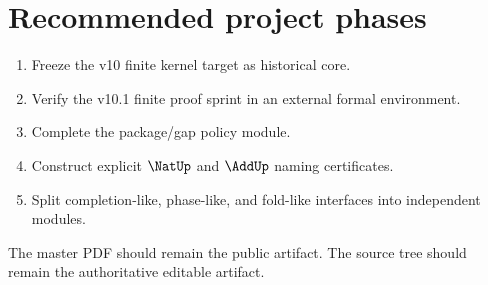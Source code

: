 \section{Recommended project phases}

\begin{enumerate}[label=\textbf{Phase \arabic*.}]
  \item Freeze the v10 finite kernel target as historical core.
  \item Verify the v10.1 finite proof sprint in an external formal environment.
  \item Complete the package/gap policy module.
  \item Construct explicit \(\NatUp\) and \(\AddUp\) naming certificates.
  \item Split completion-like, phase-like, and fold-like interfaces into independent modules.
\end{enumerate}

\begin{remark}
The master PDF should remain the public artifact. The source tree should remain the authoritative editable artifact.
\end{remark}
